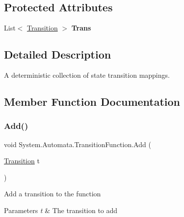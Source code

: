 \subsection*{Protected Attributes}
\begin{DoxyCompactItemize}
\item 
\mbox{\label{class_system_1_1_automata_1_1_transition_function_a565d701a23b82c6546ce8d5c8fbc7862}} 
List$<$ \mbox{\hyperlink{class_system_1_1_automata_1_1_transition}{Transition}} $>$ {\bfseries Trans}
\end{DoxyCompactItemize}


\subsection{Detailed Description}
A deterministic collection of state transition mappings. 



\subsection{Member Function Documentation}
\mbox{\label{class_system_1_1_automata_1_1_transition_function_a14ad89fa854a2d313381f986d348be88}} 
\subsubsection{\texorpdfstring{Add()}{Add()}}
{\footnotesize\ttfamily void System.\+Automata.\+Transition\+Function.\+Add (\begin{DoxyParamCaption}\item[{\mbox{\hyperlink{class_system_1_1_automata_1_1_transition}{Transition}}}]{t }\end{DoxyParamCaption})}



Add a transition to the function 


\begin{DoxyParams}{Parameters}
{\em t} & The transition to add\\
\hline
\end{DoxyParams}

